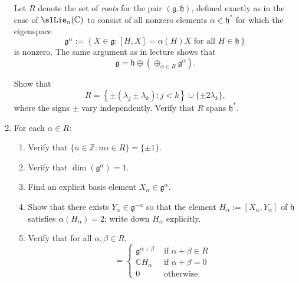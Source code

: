 \documentclass[reqno]{amsart} 
\begin{document}
\begin{homework}
\begin{enumerate}
    Let $R$ denote the set of \emph{roots} for
    the pair $(\mathfrak{g},\mathfrak{h})$,
    defined
    exactly as in the case of $\slLie_n(\mathbb{C})$
    to consist of all nonzero elements $\alpha \in \mathfrak{h}^*$
    for which the eigenspace
    \begin{equation*}
      \mathfrak{g}^\alpha := \left\{ X \in \mathfrak{g} : [H,X]
        = \alpha(H) X \text{ for all }  H \in \mathfrak{h}\right\}
    \end{equation*}
    is nonzero.
    The same argument as in lecture
    shows that
    \begin{equation*}
      \mathfrak{g} = \mathfrak{h} \oplus (\oplus_{\alpha \in R} \mathfrak{g}^\alpha).
    \end{equation*}

    Show that
    \begin{equation*}
      R = \left\{ \pm (\lambda_j \pm \lambda_k) : j < k \right\} \cup \{ \pm 2 \lambda_k \},
    \end{equation*}
    where the signs $\pm$ vary independently.
    Verify that $R$ spans $\mathfrak{h}^*$.
  \item 
    For each $\alpha \in R$:
    \begin{enumerate}
    \item Verify that
      $\{n \in \mathbb{Z} : n \alpha \in R\} = \{\pm 1\}$.
    \item Verify that $\dim(\mathfrak{g}^\alpha) = 1$.
    \item Find an explicit basis element $X_\alpha \in
      \mathfrak{g}^\alpha$.
    \item Show that there exists $Y_\alpha \in
      \mathfrak{g}^{-\alpha}$
      so that the element $H_\alpha := [X_\alpha,Y_\alpha]$
      of $\mathfrak{h}$ satisfies $\alpha(H_\alpha) = 2$; write
      down $H_\alpha$ explicitly.
    \item     Verify that for all $\alpha,\beta \in R$,
    \begin{equation*}
      [\mathfrak{g}^\alpha, \mathfrak{g}^\beta]
      = 
\begin{cases}
        \mathfrak{g}^{\alpha + \beta} & \text{ if } \alpha + \beta \in R \\
        \mathbb{C} H_\alpha  & \text{ if } \alpha + \beta = 0 \\
        0 & \text{ otherwise.}
      \end{cases}

\end{equation*}
\end{enumerate}
\end{enumerate}
\end{homework}
\end{document}
